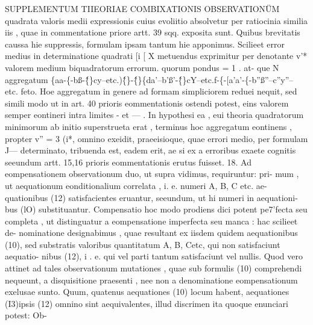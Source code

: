 \documentclass[12pt,a4paper]{article}
\begin{document}
 SUPPLEMENTUM TIIEORIAE COMBIXATIONIS OBSERVATIONÜM
quadrata valoris medii expressionis
cuius evoliitio absolvetur per ratiocinia similia iis , quae in commentatione priore
artt. 39 sqq. exposita sunt. Quibus brevitatis caussa hie suppressis, formulam
ipsam tantum hie apponimus. Scilieet error medius in determinatione quadrati
[i [ X metuendus exprimitur per
denotante v'* valorem medium biquadratorum errorum. quorum pondus = 1 . at-
que N aggregatum
\{aa-\{-bß-\^\{\}cy--etc.)\^\{\}-\^\{\}\{da'--b'ß'-\^\{\}cY--etc.f-\{-[a'a'-\{-b''ß''--c''y''-- etc. feto.
Hoe aggregatum in genere ad formam simpliciorem reduei nequit, sed simili modo
ut in art. 40 prioris eommentationis ostendi potest, eins valorem semper eontineri
intra limites - et --- . In hypothesi ea , eui theoria quadratorum minimorum ab
initio superstrueta erat , terminus hoc aggregatum eontinens , propter v'' = 3 (i*,
omnino exeidit, praeeisioque, quae errori medio, per formulam J--- determinato,
tribuenda est, eadem erit, ae si ex a erroribus exaete cognitis seeundum artt. 15,16
prioris eommentationis erutus fuisset.
18.
Ad eompensationem observationum duo, ut supra vidimus, requiruntur: pri-
mum , ut aequationum eonditionalium correlata , i. e. numeri A, B, C etc. ae-
quationibus (12) satisfacientes eruantur, seeundum, ut hi numeri in aequationi-
bus (lO) substituantur. Compensatio hoc modo prodiens dici potent pe7'fecta seu
completa , ut distinguatur a eompensatione imperfecta seu manca : hac scilieet de-
nominatione designabimus , quae resultant ex iisdem quidem aequationibus (10),
sed substratis valoribus quantitatum A, B, Cetc, qui non satisfaciunt aequatio-
nibus (12), i . e. qui vel parti tantum satisfaciunt vel nullis. Quod vero attinet ad
tales observationum mutationes , quae sub formulis (10) comprehendi nequeunt,
a disquisitione praesenti , nee non a denominatione eompensationum exelusae
sunto. Quum, quatenus aequationes (10) locum habent, aequationes (I3)ipsis
(12) omnino sint aequivalentes, illud discrimen ita quoque enunciari potest: Ob-
\end{document}
